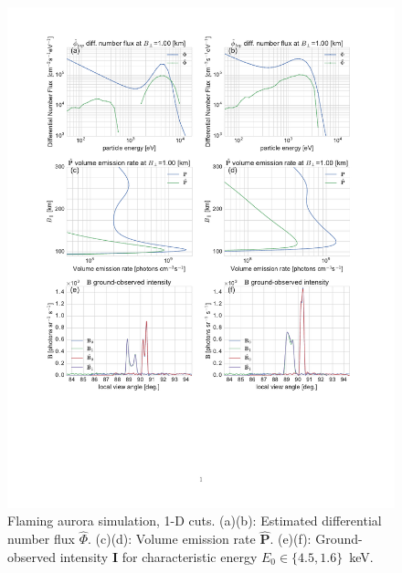 \begin{figure}\centering
\includegraphics[trim=50 150 50 40,clip,height=0.875\textheight]{gfx/flamesim1d}
\caption{Flaming aurora simulation, 1-D cuts. 
(a)(b): Estimated differential number flux $\hat{\Phi}$.
(c)(d): Volume emission rate $\hat{\mathbf{P}}$. 
(e)(f): Ground-observed intensity $\mathbf{I}$ for characteristic energy $E_0\in\{4.5,1.6\}$~keV.}\label{fig:est1dflame}
\end{figure}
